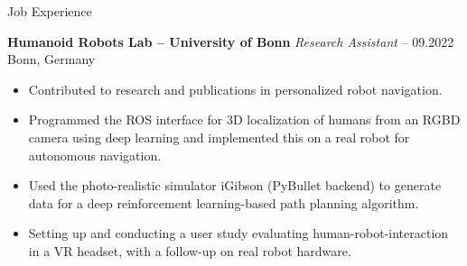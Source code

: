\begin{rubric}{Job Experience}

%
%
\entry*[] \textbf{Humanoid Robots Lab -- University of Bonn} \hfill \textit{Research Assistant}  -- 09.2022 \hfill Bonn, Germany \newline 
\vspace{\CVItemizeHeaderSpacing} \begin{itemize} %
	\setlength{\itemsep}{\CVItemizeSpacing}
	
	
	\item Contributed to research and publications in personalized robot navigation.
	\item Programmed the ROS interface for 3D localization of humans from an RGBD camera using deep learning and implemented this on a real robot for autonomous navigation.
	\item Used the photo-realistic simulator iGibson (PyBullet backend) to generate data for a deep reinforcement learning-based path planning algorithm. 
	\item Setting up and conducting a user study evaluating human-robot-interaction in a VR headset, with a follow-up on real robot hardware.
	
\end{itemize}


\end{rubric}
